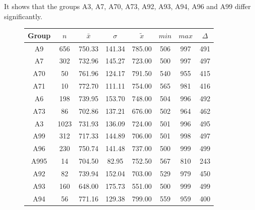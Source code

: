 It shows that the groups A3, A7, A70, A73, A92, A93, A94, A96 and A99 differ significantly.
\begin{figure}[ht!]
	\centering
	\begin{minipage}{0.5\textwidth}
		\tiny
		\centering
		\begin{tabular}{c|c|c|c|c|c|c|c}
			\toprule
			Group & $n$ & $\bar{x}$ & $\sigma$ & $\tilde{x}$ & $min$ & $max$ & $\Delta$ \\
			\midrule
			A9   & 656  & 750.33 & 141.34 & 785.00 & 506 & 997 & 491 \\ 
			A7   & 302  & 732.96 & 145.27 & 723.00 & 500 & 997 & 497 \\ 
			A70  & 50   & 761.96 & 124.17 & 791.50 & 540 & 955 & 415 \\ 
			A71  & 10   & 772.70 & 111.11 & 754.00 & 565 & 981 & 416 \\ 
			A6   & 198  & 739.95 & 153.70 & 748.00 & 504 & 996 & 492 \\ 
			A73  & 86   & 702.86 & 137.21 & 676.00 & 502 & 964 & 462 \\ 
			A3   & 1023 & 731.93 & 136.09 & 724.00 & 501 & 996 & 495 \\ 
			A99  & 312  & 717.33 & 144.89 & 706.00 & 501 & 998 & 497 \\ 
			A96  & 230  & 750.74 & 141.48 & 737.00 & 500 & 999 & 499 \\ 
			A995 & 14   & 704.50 & 82.95  & 752.50 & 567 & 810 & 243 \\ 
			A92  & 82   & 739.94 & 152.04 & 703.00 & 529 & 979 & 450 \\ 
			A93  & 160  & 648.00 & 175.73 & 551.00 & 500 & 999 & 499 \\ 
			A94  & 56   & 771.16 & 129.38 & 799.00 & 559 & 959 & 400 \\ 
			\bottomrule
		\end{tabular}
		\label{tbl:descriptives_arbis_matched_Strasse_TLHGV}
	\end{minipage}%
	\begin{minipage}{0.55\textwidth}
\end{minipage}
\end{figure}
